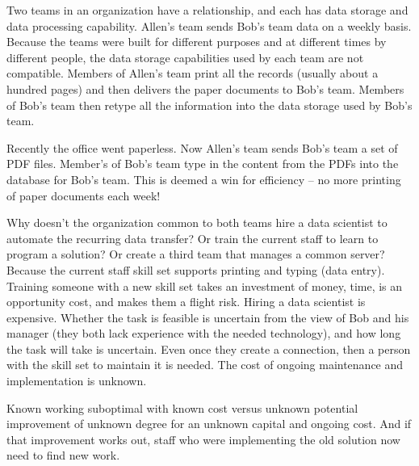 \begin{mdframed}[frametitle={Data Transfer from one Team to Another},frametitlerule=true,frametitlealignment=\centering]
Two teams in an organization have a relationship, and each has data storage and data processing capability. Allen's team sends Bob's team data on a weekly basis. Because the teams were built for different purposes and at different times by different people, the data storage capabilities used by each team are not compatible. Members of Allen's team print all the records (usually about a hundred pages) and then delivers the paper documents to Bob's team. Members of Bob's team then retype all the information into the data storage used by Bob's team.

Recently the office went paperless. Now Allen's team sends Bob's team a set of PDF files. Member's of Bob's team type in the content from the PDFs into the database for Bob's team. This is deemed a win for efficiency -- no more printing of paper documents each week!

Why doesn't the organization common to both teams hire a data scientist to automate the recurring data transfer? Or train the current staff to learn to program a solution? Or create a third team that manages a common server?
Because the current staff skill set supports printing and typing (data entry). Training someone with a new skill set takes an investment of money, time, is an opportunity cost, and makes them a flight risk.
Hiring a data scientist is expensive. Whether the task is feasible is uncertain from the view of Bob and his manager (they both lack experience with the needed technology), and how long the task will take is uncertain. Even once they create a connection, then a person with the skill set to maintain it is needed. The cost of ongoing maintenance and implementation is unknown.

Known working suboptimal with known cost versus unknown potential improvement of unknown degree for an unknown capital and ongoing cost. And if that improvement works out, staff who were implementing the old solution now need to find new work.
\end{mdframed}
